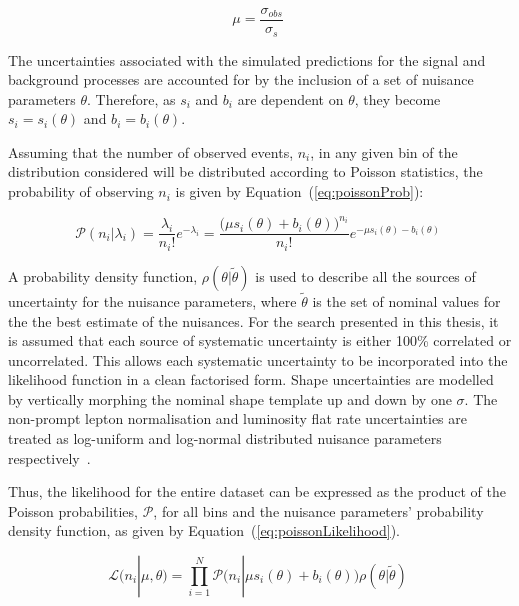 \begin{equation}
\mu = \frac{\sigma_{obs}}{\sigma_{s}}  \;
\label{eq:signalModifier}
\end{equation}
 
The uncertainties associated with the simulated predictions for the signal and background processes are accounted for by the inclusion of a set of nuisance parameters $\theta$.
Therefore, as $s_{i}$ and $b_{i}$ are dependent on $\theta$, they become $s_{i} = s_{i} (\theta)$ and $b_{i} = b_{i} (\theta)$.

Assuming that the number of observed events, $n_{i}$, in any given bin of the distribution considered will be distributed according to Poisson statistics, the probability of observing $n_{i}$ is given by Equation~(\ref{eq:poissonProb}):

\begin{equation}
\mathcal{P} ( n_{i} | \lambda_{i} ) = \frac{\lambda_{i}}{n_{i}!} e^{- \lambda_{i}} = \frac{ \big( \mu s_{i}(\theta) + b_{i}(\theta) \big)^{n_{i}}}{n_{i} !} e^{- \mu s_{i}(\theta) - b_{i}(\theta)}  \;
\label{eq:poissonProb}
\end{equation}

A probability density function, $\rho ( \theta | \tilde{\theta} )$ is used to describe all the sources of uncertainty for the nuisance parameters, where $\tilde{\theta}$ is the set of nominal values for the the best estimate of the nuisances.
For the search presented in this thesis, it is assumed that each source of systematic uncertainty is either 100\% correlated or uncorrelated.
This allows each systematic uncertainty to be incorporated into the likelihood function in a clean factorised form.
Shape uncertainties are modelled by vertically morphing the nominal shape template up and down by one $\sigma$.
The non-prompt lepton normalisation and luminosity flat rate uncertainties are treated as log-uniform and log-normal distributed nuisance parameters respectively~\cite{Baak:2014fta,AsymptoticFormulae}.

Thus, the likelihood for the entire dataset can be expressed as the product of the Poisson probabilities, $\mathcal{P}$, for all bins and the nuisance parameters' probability density function, as given by Equation~(\ref{eq:poissonLikelihood}).

\begin{equation}
\mathcal{L} ( n_{i} | \mu , \theta ) = 
\prod_{i=1}^{N} \mathcal{P} \big( n_{i} | \mu s_{i}(\theta) + b_{i}(\theta) \big) \rho ( \theta | \tilde{\theta} ) \;
\label{eq:poissonLikelihood}
\end{equation}

